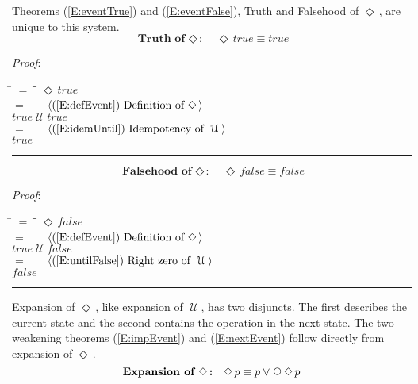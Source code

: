 \documentclass[12pt, fleqn, leqno]{article}
\newcommand{\lgap}{2pt}                             %
\newcommand{\mymathindent}{24pt}                    %
\newcommand{\Until}{\;\mathcal{U}\;}
\newcommand{\Next}{\;\,\text{\raisebox{3.5pt}{\circle{6}}}}
\newcommand{\Event}{\Diamond\,}
\newcommand{\myqed}{\rule[-.23ex]{1.2ex}{2.0ex}}
\newcommand{\myqedtab}{\hspace{384pt}}              %
\newcommand{\Gll} {\langle}                         %
\newcommand{\Ggg} {\rangle}                         %
\newcommand{\Hint}[1]     {\ \ \ $\Gll              \mbox{#1} \Ggg$ }   %
\begin{document}
Theorems (\ref{E:eventTrue}) and (\ref{E:eventFalse}), Truth and Falsehood of $\Event$, are unique to this system.
\begin{equation}\label{E:eventTrue}
\textbf{Truth of $\Event$:}\quad \Event true \equiv true
\end{equation}

\emph{Proof}:
\begin{tabbing}
\hspace{\mymathindent} \= $= \;$ \= \myqedtab \= \kill
  \> \>   $\Event true$\\[\lgap]
  \> $=$  \>  \Hint{(\ref{E:defEvent}) Definition of $\Event$}\\[\lgap]
  \> \>   $true \Until true$\\[\lgap]
  \> $=$  \>  \Hint{(\ref{E:idemUntil}) Idempotency of $\Until$}\\[\lgap]
  \> \>   $true$ \quad \myqed
\end{tabbing}
\begin{equation}\label{E:eventFalse}
\textbf{Falsehood of $\Event$:}\quad \Event false \equiv false
\end{equation}

\emph{Proof}:
\begin{tabbing}
\hspace{\mymathindent} \= $= \;$ \= \myqedtab \= \kill
  \> \>   $\Event false$\\[\lgap]
  \> $=$  \>  \Hint{(\ref{E:defEvent}) Definition of $\Event$}\\[\lgap]
  \> \>   $true \Until false$\\[\lgap]
  \> $=$  \>  \Hint{(\ref{E:untilFalse}) Right zero of $\Until$}\\[\lgap]
  \> \>   $false$ \quad \myqed
\end{tabbing}

Expansion of $\Event$, like expansion of $\Until$, has two disjuncts.
The first describes the current state and the second contains the operation in the next state.
The two weakening theorems (\ref{E:impEvent}) and (\ref{E:nextEvent}) follow directly from expansion of $\Event$.
\begin{equation}\label{E:expansionEvent}
\textbf{Expansion of $\Event$:}\quad \Event p \equiv p \lor \Next\Event p
\end{equation}
\end{document}
